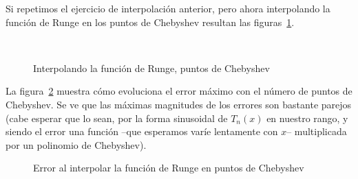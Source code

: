   Si repetimos el ejercicio de interpolación anterior,
  pero ahora interpolando la función de Runge en los puntos de Chebyshev
  resultan las figuras~\ref{fig:Chebyshev-Runge-function}.
  \begin{figure}[ht]
    \centering
     \\
    \caption{Interpolando la función de Runge, puntos de Chebyshev}
    \label{fig:Chebyshev-Runge-function}
  \end{figure}
  La figura~\ref{fig:Chebyshev-error} muestra cómo evoluciona el error máximo
  con el número de puntos de Chebyshev.
  Se ve que las máximas magnitudes de los errores son bastante parejos
  (cabe esperar que lo sean,
   por la forma sinusoidal de \(T_n(x)\) en nuestro rango,
   y siendo el error una función
   --que esperamos varíe lentamente con \(x\)--
   multiplicada por un polinomio de Chebyshev).
  \begin{figure}[ht]
    \centering
    \caption{Error al interpolar la función de Runge
             en puntos de Chebyshev}
    \label{fig:Chebyshev-error}
  \end{figure}




